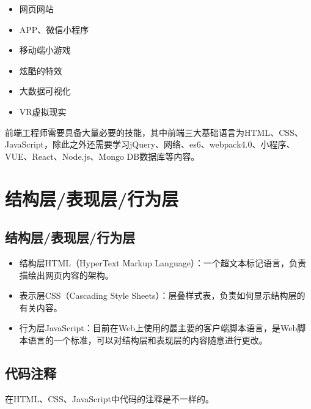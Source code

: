 \begin{itemize}
    \item 网页网站
    \item APP、微信小程序
    \item 移动端小游戏
    \item 炫酷的特效
    \item 大数据可视化
    \item VR虚拟现实
\end{itemize}

前端工程师需要具备大量必要的技能，其中前端三大基础语言为HTML、CSS、JavaScript，除此之外还需要学习jQuery、网络、es6、webpack4.0、小程序、VUE、React、Node.js、Mongo DB数据库等内容。 \\

\newpage

\section{结构层/表现层/行为层}

\subsection{结构层/表现层/行为层}

\begin{itemize}
    \item 结构层HTML（HyperText Markup Language）：一个超文本标记语言，负责描绘出网页内容的架构。
    
    \item 表示层CSS（Cascading Style Sheets）：层叠样式表，负责如何显示结构层的有关内容。
    
    \item 行为层JavaScript：目前在Web上使用的最主要的客户端脚本语言，是Web脚本语言的一个标准，可以对结构层和表现层的内容随意进行更改。
\end{itemize}

\subsection{代码注释}

在HTML、CSS、JavaScript中代码的注释是不一样的。

